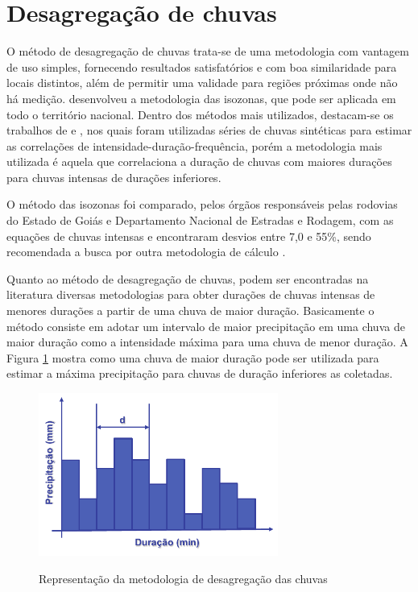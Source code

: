 \section{Desagregação de chuvas}

O método de desagregação de chuvas trata-se de uma metodologia com vantagem de uso simples, fornecendo resultados satisfatórios e com boa similaridade para locais distintos, além de permitir uma validade para regiões próximas onde não há medição.  desenvolveu a metodologia das isozonas, que pode ser aplicada em todo o território nacional. Dentro dos métodos mais utilizados, destacam-se os trabalhos de  e , nos quais foram utilizadas séries de chuvas sintéticas para estimar as correlações de intensidade-duração-frequência, porém a metodologia mais utilizada é aquela que correlaciona a duração de chuvas com maiores durações para chuvas intensas de durações inferiores.

O método das isozonas foi comparado, pelos órgãos responsáveis pelas rodovias do Estado de Goiás e Departamento Nacional de Estradas e Rodagem, com as equações de chuvas intensas e encontraram desvios entre 7,0 e 55\%, sendo recomendada a busca por outra metodologia de cálculo \cite{isozonas}.

Quanto ao método de desagregação de chuvas, podem ser encontradas na literatura diversas metodologias para obter durações de chuvas intensas de menores durações a partir de uma chuva de maior duração. Basicamente o método consiste em adotar um intervalo de maior precipitação em uma chuva de maior duração como a intensidade máxima para uma chuva de menor duração. A Figura \ref{fig:desagregacao} mostra como uma chuva de maior duração pode ser utilizada para estimar a máxima precipitação para chuvas de duração inferiores as coletadas.

\begin{figure}[h]
    \caption{Representação da metodologia de desagregação das chuvas}
    \centering
    \includegraphics[width=0.7\textwidth]{Textuais/Figuras/desagregacao.pdf}
    \label{fig:desagregacao}
\end{figure}

